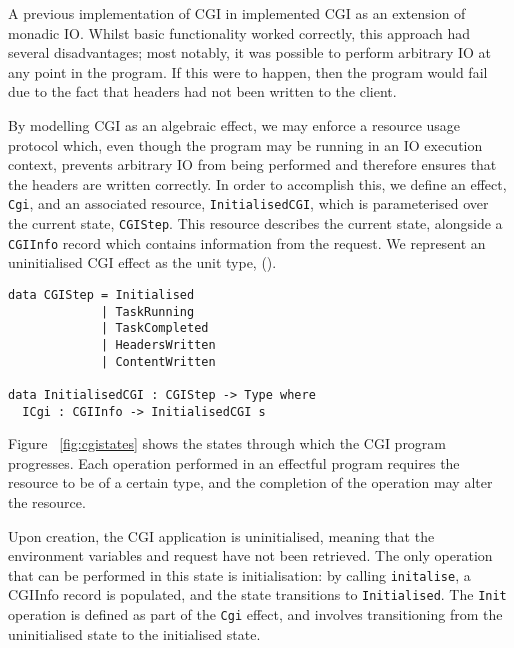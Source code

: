 \documentclass[preprint]{sigplanconf}
\begin{document}
A previous implementation of CGI in \idris{} implemented CGI as an extension of monadic IO. Whilst basic functionality worked correctly, this approach had several disadvantages; most notably, it was possible to perform arbitrary IO at any point in the program. If this were to happen, then the program would fail due to the fact that headers had not been written to the client.

By modelling CGI as an algebraic effect, we may enforce a resource usage protocol which, even though the program may be running in an IO execution context, prevents arbitrary IO from being performed and therefore ensures that the headers are written correctly. In order to accomplish this, we define an effect, \texttt{Cgi}, and an associated resource, \texttt{InitialisedCGI}, which is parameterised over the current state, \texttt{CGIStep}. This resource describes the current state, alongside a \texttt{CGIInfo} record which contains information from the request. We represent an uninitialised CGI effect as the unit type, ().
{\small
\begin{verbatim}
data CGIStep = Initialised 
             | TaskRunning 
             | TaskCompleted 
             | HeadersWritten 
             | ContentWritten

data InitialisedCGI : CGIStep -> Type where
  ICgi : CGIInfo -> InitialisedCGI s
\end{verbatim}
}
Figure ~\ref{fig:cgistates} shows the states through which the CGI program progresses. Each operation performed in an effectful program requires the resource to be of a certain type, and the completion of the operation may alter the resource.

Upon creation, the CGI application is uninitialised, meaning that the environment variables and request have not been retrieved. The only operation that can be performed in this state is initialisation: by calling \texttt{initalise}, a CGIInfo record is populated, and the state transitions to \texttt{Initialised}. The \texttt{Init} operation is defined as part of the \texttt{Cgi} effect, and involves transitioning from the uninitialised state to the initialised state.
\end{document}
